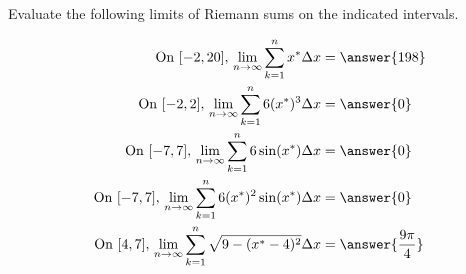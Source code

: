 \documentclass{ximera}
\author{Nela Lakos \and Kyle Parsons}
\begin{document}
\begin{exercise}

Evaluate the following limits of Riemann sums on the indicated intervals.

\begin{align*}
\text{On } [-2,20],\,\lim_{n\to\infty}\sum_{k=1}^n x^* \Delta x &= \answer{198}\\
\text{On } [-2,2],\,\lim_{n\to\infty}\sum_{k=1}^n 6(x^*)^3 \Delta x &= \answer{0}\\
\text{On } [-7,7],\,\lim_{n\to\infty}\sum_{k=1}^n 6\sin(x^*) \Delta x &= \answer{0}\\
\text{On } [-7,7],\,\lim_{n\to\infty}\sum_{k=1}^n 6(x^*)^2\sin(x^*) \Delta x &= \answer{0}\\
\text{On } [4,7],\,\lim_{n\to\infty}\sum_{k=1}^n \sqrt{9-(x^*-4)^2} \Delta x &= \answer{\frac{9\pi}{4}}
\end{align*}

\end{exercise}
\end{document}
